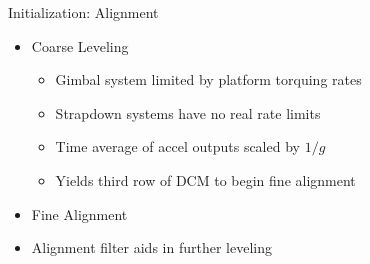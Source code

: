 \begin{frame}
Initialization:  Alignment
 \begin{itemize}
 \item Coarse Leveling
  \begin{itemize}
    \item Gimbal system limited by platform torquing rates
    \item Strapdown systems have no real rate limits
    \item Time average of accel outputs scaled by $1/g$
	\item Yields third row of DCM to begin fine alignment
  \end{itemize}
 \item Fine Alignment
 \item Alignment filter aids in further leveling
\end{itemize}
\end{frame}
